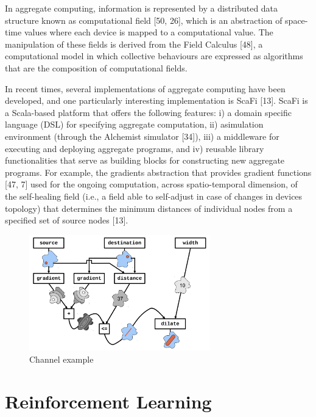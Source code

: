\documentclass[12pt,a4paper,openright,twoside]{book}
\begin{document}
In aggregate computing, information is represented by a distributed data structure known as computational field [50, 26],
    which is an abstraction of space-time values where each device is mapped to a computational value.
    The manipulation of these fields is derived from the Field Calculus [48], a computational model in which collective 
    behaviours are expressed as algorithms that are the composition of computational fields.

In recent times, several implementations of aggregate computing have been developed, and one particularly interesting 
    implementation is ScaFi [13]. ScaFi is a Scala-based platform that offers the following features: 
    i) a domain specific language (DSL) for specifying aggregate computation, 
    ii) asimulation environment (through the Alchemist simulator [34]), 
    iii) a middleware for executing and deploying aggregate programs, and 
    iv) reusable library functionalities that serve as building blocks for constructing new aggregate programs. 
    For example, the gradients abstraction that provides gradient functions [47, 7] used for the ongoing computation, 
    across spatio-temporal dimension, of the self-healing field (i.e., a field able to self-adjust in case of changes 
    in devices topology) that determines the minimum distances of individual nodes from a specified set of source 
    nodes [13].

    \begin{figure}[h!]
        \centering
        \includegraphics[width=0.7\textwidth]{figures/channel.png}
        \caption{Channel example}
        \label{fig:channel}
    \end{figure}

      

%
\section{Reinforcement Learning}
%
\end{document}
